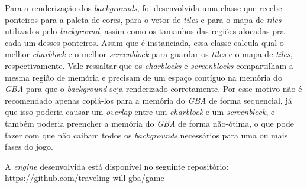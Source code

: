 Para a renderização dos \textit{backgrounds}, foi desenvolvida uma classe que recebe ponteiros para a paleta de cores,  para o vetor de \textit{tiles} e para o mapa de \textit{tiles} utilizados pelo \textit{background}, assim como os tamanhos das regiões alocadas pra cada um desses ponteiros. Assim que é instanciada, essa classe calcula qual o melhor \textit{charblock} e o melhor \textit{screenblock} para guardar os \textit{tiles} e o mapa de \textit{tiles}, respectivamente. Vale ressaltar que os \textit{charblocks} e \textit{screenblocks} compartilham a mesma região de memória e precisam de um espaço contíguo na memória do \textit{GBA} para que o \textit{background} seja renderizado corretamente. Por esse motivo não é recomendado apenas copiá-los para a memória do \textit{GBA} de forma sequencial, já que isso poderia causar um \textit{overlap} entre um \textit{charblock} e um \textit{screenblock}, e também poderia preencher a memória do \textit{GBA} de forma não-ótima, o que pode fazer com que não caibam todos os \textit{backgrounds} necessários para uma ou mais fases do jogo.

A \textit{engine} desenvolvida está disponível no seguinte repositório: \url{https://github.com/traveling-will-gba/game}
